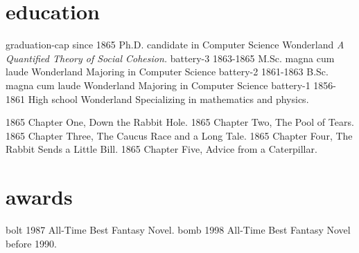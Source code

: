 \documentclass[icon]{twentysecondcv}
\begin{document}
\section{education}

\begin{twentyicon}
  \twentyitemicon
    {graduation-cap}
    {since 1865}
    {Ph.D. {\normalfont candidate in Computer Science}}
    {Wonderland}
    {\emph{A Quantified Theory of Social Cohesion.}}
  \twentyitemicon
    {battery-3}
    {1863-1865}
    {M.Sc. magna cum laude}
    {Wonderland}
    {Majoring in Computer Science}
  \twentyitemicon
    {battery-2}
    {1861-1863}
    {B.Sc. magna cum laude}
    {Wonderland}
    {Majoring in Computer Science}
  \twentyitemicon
    {battery-1}
    {1856-1861}
    {High school}
    {Wonderland}
    {Specializing in mathematics and physics.}
\end{twentyicon}

\begin{twentyshort}
  \twentyitemshort
    {1865}
    {Chapter One, Down the Rabbit Hole.}
  \twentyitemshort
    {1865}
    {Chapter Two, The Pool of Tears.}
  \twentyitemshort
    {1865}
    {Chapter Three,  The Caucus Race and a Long Tale.}
  \twentyitemshort
    {1865}
    {Chapter Four,  The Rabbit Sends a Little Bill.}
  \twentyitemshort
    {1865}
    {Chapter Five,  Advice from a Caterpillar.}
\end{twentyshort}

\section{awards}
\begin{twentyshorticon}
  \twentyitemshorticon
    {bolt}
    {1987}
    {All-Time Best Fantasy Novel.}
  \twentyitemshorticon
    {bomb}
    {1998}
    {All-Time Best Fantasy Novel before 1990.}
\end{twentyshorticon}
\end{document}
